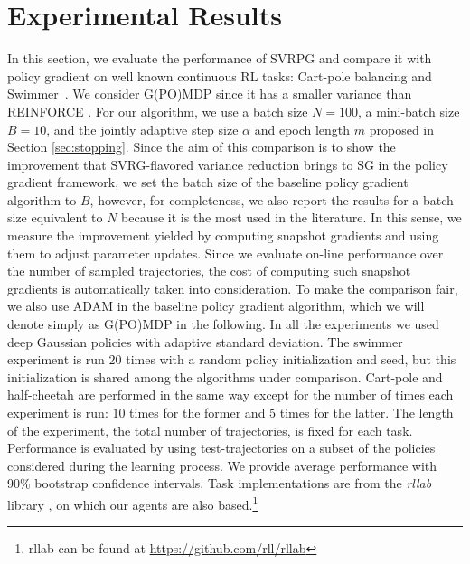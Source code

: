 \section{Experimental Results}\label{sec:exp}
\vspace{-0.05in}
In this section, we evaluate the performance of \acs{SVRPG} and compare it with policy gradient on well known continuous \acs{RL} tasks: Cart-pole balancing and Swimmer~\citep[\eg][]{duan2016benchmarking}.
We consider G(PO)MDP since it has a smaller variance than REINFORCE \citep{zhao2011analysis}.
For our algorithm, we use a batch size $N=100$, a mini-batch size $B=10$, and the jointly adaptive step size $\alpha$ and epoch length $m$ proposed in Section \ref{sec:stopping}. Since the aim of this comparison is to show the improvement that \acs{SVRG}-flavored variance reduction brings to \acs{SG} in the policy gradient framework, we set the batch size of the baseline policy gradient algorithm to $B$, however, for completeness, we also report the results for a batch size equivalent to $N$ because it is the most used in the literature. In this sense, we measure the improvement yielded by computing snapshot gradients and using them to adjust parameter updates. Since we evaluate on-line performance over the number of sampled trajectories, the cost of computing such snapshot gradients is automatically taken into consideration. To make the comparison fair, we also use \acs{ADAM} in the baseline policy gradient algorithm, which we will denote simply as G(PO)MDP in the following.
In all the experiments we used deep Gaussian policies with adaptive standard deviation.
The swimmer experiment is run $20$ times with a random policy initialization and seed, but this initialization is shared among the algorithms under comparison. Cart-pole and half-cheetah are performed in the same way except for the number of times each experiment is run: $10$ times for the former and $5$ times for the latter. The length of the experiment, \ie the total number of trajectories, is fixed for each task. Performance is evaluated by using test-trajectories on a subset of the policies considered during the learning process. We provide average performance with 90\% bootstrap confidence intervals.  
Task implementations are from the \textit{rllab} library \citep{duan2016benchmarking}, on which our agents are also based.\footnote{rllab can be found at \url{https://github.com/rll/rllab}}

